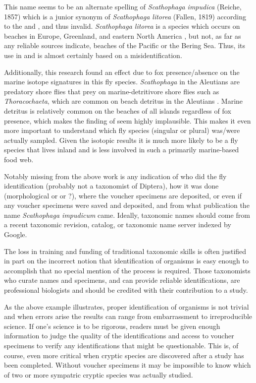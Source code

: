 This name seems to be an alternate spelling of \textit{Scathophaga impudica} (Reiche, 1857) which is a junior synonym of \textit{Scathophaga litorea} (Fallen, 1819) according to the \citet{Vockeroth1965} and \citet{Sifner2008}, and thus invalid. \textit{Scathophaga litorea} is a species which occurs on beaches in Europe, Greenland, and eastern North America \citep{Vockeroth1965, Sifner2008, GBIF2020Scathophagalitorea}, but not, as far as any reliable sources indicate, beaches of the Pacific or the Bering Sea. Thus, its use in \citet{Croll2005} and \citet{Maronetal2006} is almost certainly based on a misidentification. 

Additionally, this research found an effect due to fox presence/absence on the marine isotope signatures in this fly species. \textit{Scathophaga} in the Aleutians are predatory shore flies that prey on marine-detritivore shore flies such as \textit{Thoracochaeta}, which are common on beach detritus in the Aleutians \citep[e.g.,][]{Walkeretal2013}. Marine detritus is relatively common on the beaches of all islands regardless of fox presence, which makes the finding of \citet{Croll2005} seem highly implausible. This makes it even more important to understand which fly species (singular or plural) was/were actually sampled. Given the isotopic results it is much more likely to be a fly species that lives inland and is less involved in such a primarily marine-based food web.

Notably missing from the above work is any indication of who did the fly identification (probably not a taxonomist of Diptera), how it was done (morphological or  or ?), where the voucher specimens are deposited, or even if any voucher specimens were saved and deposited, and from what publication the name \textit{Scathophaga impudicum} came. Ideally, taxonomic names should come from a recent taxonomic revision, catalog, or taxonomic name server indexed by Google.

The loss in training and funding of traditional taxonomic skills is often justified in part on the incorrect notion that identification of organisms is easy enough to accomplish that no special mention of the process is required. Those taxonomists who curate names and specimens, and can provide reliable identifications, are professional biologists and should be credited with their contribution to a study.

 As the above example illustrates, proper identification of organisms is not trivial and when errors arise the results can range from embarrassment to irreproducible science. If one’s science is to be rigorous, readers must be given enough information to judge the quality of the identifications and access to voucher specimens to verify any identifications that might be questionable. This is, of course, even more critical when cryptic species are discovered after a study has been completed. Without voucher specimens it may be impossible to know which of two or more sympatric cryptic species was actually studied.


